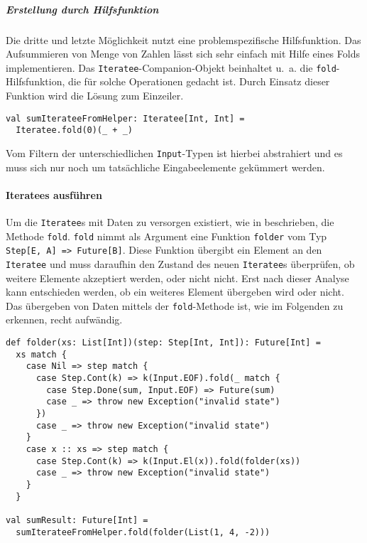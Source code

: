 \documentclass[draft=false
              ,paper=a4
              ,twoside=false
              ,fontsize=11pt
              ,headsepline
              ,BCOR10mm
              ,DIV11
              ]{scrbook}
\begin{document}
\subparagraph{Erstellung durch Hilfsfunktion} %
\label{subp:erstellung_durch_hilfsfunktion}\mbox{} %

Die dritte und letzte Möglichkeit nutzt eine problemspezifische Hilfsfunktion.
Das Aufsummieren von Menge von Zahlen lässt sich sehr einfach mit Hilfe eines Folds implementieren.
Das \lstinline|Iteratee|-Companion-Objekt beinhaltet u.~a. die \lstinline|fold|-Hilfsfunktion, die für solche Operationen gedacht ist.
Durch Einsatz dieser Funktion wird die Lösung zum Einzeiler.

\begin{lstlisting}
val sumIterateeFromHelper: Iteratee[Int, Int] =
  Iteratee.fold(0)(_ + _)
\end{lstlisting}

Vom Filtern der unterschiedlichen \lstinline|Input|-Typen ist hierbei abstrahiert und es muss sich nur noch um tatsächliche Eingabeelemente gekümmert werden.



\paragraph{Iteratees ausführen} %
\label{par:iteratees_ausfuehren}\mbox{} %

Um die \lstinline|Iteratee|s mit Daten zu versorgen existiert, wie in  beschrieben, die Methode \lstinline|fold|.
\lstinline|fold| nimmt als Argument eine Funktion \lstinline|folder| vom Typ \lstinline|Step[E, A] => Future[B]|.
Diese Funktion übergibt ein Element an den \lstinline|Iteratee| und muss daraufhin den Zustand des neuen \lstinline|Iteratee|s überprüfen, ob weitere Elemente akzeptiert werden, oder nicht nicht.
Erst nach dieser Analyse kann entschieden werden, ob ein weiteres Element übergeben wird oder nicht.
Das übergeben von Daten mittels der \lstinline|fold|-Methode ist, wie im Folgenden zu erkennen, recht aufwändig.

\begin{lstlisting}
def folder(xs: List[Int])(step: Step[Int, Int]): Future[Int] =
  xs match {
    case Nil => step match {
      case Step.Cont(k) => k(Input.EOF).fold(_ match {
        case Step.Done(sum, Input.EOF) => Future(sum)
        case _ => throw new Exception("invalid state")
      })
      case _ => throw new Exception("invalid state")
    }
    case x :: xs => step match {
      case Step.Cont(k) => k(Input.El(x)).fold(folder(xs))
      case _ => throw new Exception("invalid state")
    }
  }

val sumResult: Future[Int] =
  sumIterateeFromHelper.fold(folder(List(1, 4, -2)))
\end{lstlisting}
\end{document}
